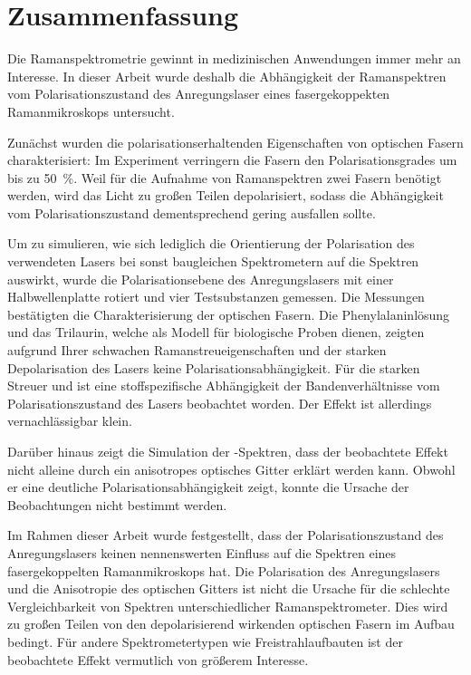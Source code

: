 \documentclass[a4paper,12pt,twoside,parskip=no,headsepline,open=right,ngerman,export]{scrreprt}
\begin{document}
    \chapter{Zusammenfassung}
        
        Die Ramanspektrometrie gewinnt in medizinischen Anwendungen immer mehr an Interesse. In dieser Arbeit wurde deshalb die Abhängigkeit der Ramanspektren vom Polarisationszustand des Anregungslaser eines fasergekoppekten Ramanmikroskops untersucht.
        
        Zunächst wurden die polarisationserhaltenden Eigenschaften von optischen Fasern charakterisiert: Im Experiment verringern die Fasern den Polarisationsgrades um bis zu \SI{50}{\percent}. Weil für die Aufnahme von Ramanspektren zwei Fasern benötigt werden, wird das Licht zu großen Teilen depolarisiert, sodass die Abhängigkeit vom Polarisationszustand dementsprechend gering ausfallen sollte.
        
        Um zu simulieren, wie sich lediglich die Orientierung der Polarisation des verwendeten Lasers bei sonst baugleichen Spektrometern auf die Spektren auswirkt, wurde die Polarisationsebene des Anregungslasers mit einer Halbwellenplatte rotiert und vier Testsubstanzen gemessen.
        Die Messungen bestätigten die Charakterisierung der optischen Fasern. Die Phenylalaninlösung und das Trilaurin, welche als Modell für biologische Proben dienen, zeigten aufgrund Ihrer schwachen Ramanstreueigenschaften und der starken Depolarisation des Lasers keine Polarisationsabhängigkeit. Für die starken Streuer  und  ist eine stoffspezifische Abhängigkeit der Bandenverhältnisse vom Polarisationszustand des Lasers beobachtet worden. Der Effekt ist allerdings vernachlässigbar klein.
        
        Darüber hinaus zeigt die Simulation der -Spektren, dass der beobachtete Effekt nicht alleine durch ein anisotropes optisches Gitter erklärt werden kann. Obwohl er eine deutliche Polarisationsabhängigkeit zeigt, konnte die Ursache der Beobachtungen nicht bestimmt werden.
        
        Im Rahmen dieser Arbeit wurde festgestellt, dass der Polarisationszustand des Anregungslasers keinen nennenswerten Einfluss auf die Spektren eines fasergekoppelten Ramanmikroskops hat. Die Polarisation des Anregungslasers und die Anisotropie des optischen Gitters ist nicht die Ursache für die schlechte Vergleichbarkeit von Spektren unterschiedlicher Ramanspektrometer. Dies wird zu großen Teilen von den depolarisierend wirkenden optischen Fasern im Aufbau bedingt. Für andere Spektrometertypen wie Freistrahlaufbauten ist der beobachtete Effekt vermutlich von größerem Interesse.
\end{document}
